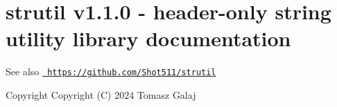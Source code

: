 \chapter{strutil v1.1.0 -\/ header-\/only string utility library documentation}
\hypertarget{index}{}\label{index}
\begin{DoxySeeAlso}{See also}
\href{https://github.com/Shot511/strutil}{\texttt{ https\+://github.\+com/\+Shot511/strutil}}
\end{DoxySeeAlso}
\begin{DoxyCopyright}{Copyright}
Copyright (C) 2024 Tomasz Galaj 
\end{DoxyCopyright}
